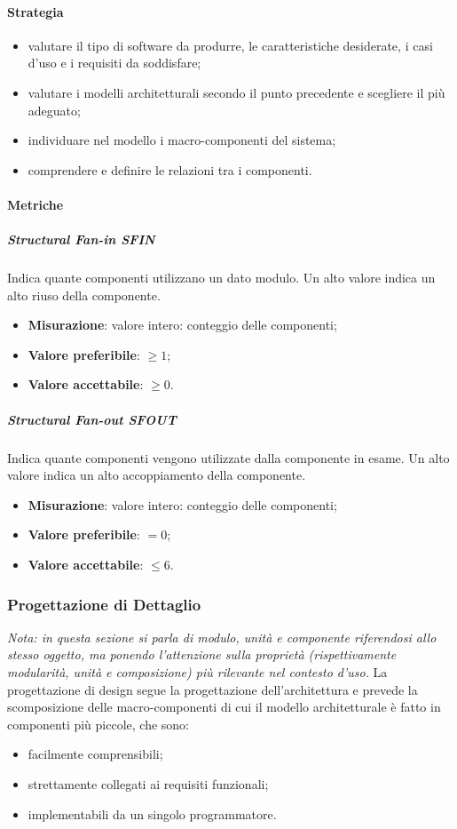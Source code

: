 		\paragraph{Strategia}
		\begin{itemize}
			\item valutare il tipo di software da produrre, le caratteristiche desiderate, i casi d'uso e i requisiti da soddisfare;
			\item valutare i modelli architetturali secondo il punto precedente e scegliere il più adeguato;
			\item individuare nel modello i macro-componenti del sistema;
			\item comprendere e definire le relazioni tra i componenti.
		\end{itemize}
		\paragraph{Metriche}
			\subparagraph{Structural Fan-in \textbf{SFIN}}
			Indica quante componenti utilizzano un dato modulo. Un alto valore indica un alto riuso della componente.
			\begin{itemize}
				\item \textbf{Misurazione}: valore intero: conteggio delle componenti;
				\item \textbf{Valore preferibile}: $ \geq 1$;
				\item \textbf{Valore accettabile}: $ \geq 0$.
			\end{itemize}
			\subparagraph{Structural Fan-out \textbf{SFOUT}}
			Indica quante componenti vengono utilizzate dalla componente in esame. Un alto valore indica un alto
accoppiamento della componente.
			\begin{itemize}
				\item \textbf{Misurazione}: valore intero: conteggio delle componenti;
				\item \textbf{Valore preferibile}: $ = 0$;
				\item \textbf{Valore accettabile}: $ \leq 6$.
			\end{itemize}
			
	\subsubsection{Progettazione di Dettaglio}
	\textit{Nota: in questa sezione si parla di modulo, unità e componente riferendosi allo stesso oggetto, ma ponendo l'attenzione sulla proprietà (rispettivamente modularità, unità e composizione) più rilevante nel contesto d'uso.}\newline 
	La progettazione di design segue la progettazione dell'architettura e prevede la scomposizione delle macro-componenti di cui il modello architetturale è fatto in componenti più piccole, che sono:
	\begin{itemize}
		\item facilmente comprensibili;
		\item strettamente collegati ai requisiti funzionali;
		\item implementabili da un singolo programmatore.
	\end{itemize}
